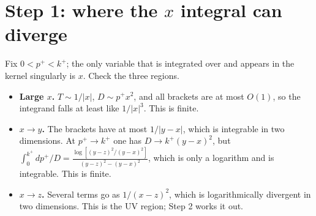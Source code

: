 \documentclass[10pt]{article}
\numberwithin{equation}{section}
\begin{document}
\section{Step 1: where the $x$ integral can diverge}
Fix $0<p^{+}<k^{+}$; the only variable that is integrated over and appears in the kernel singularly is $x$. Check the three regions.
\begin{itemize}
\item \textbf{Large $x$.} $T\sim1/|x|$, $D\sim p^{+}x^{2}$, and all brackets are at most $O(1)$, so the integrand falls at least like $1/|x|^{3}$. This is finite.
\item \textbf{$x\to y$.} The brackets have at most $1/|y-x|$, which is integrable in two dimensions. At $p^{+}\to k^{+}$ one has $D\to k^{+}(y-x)^{2}$, but $\int_{0}^{k^{+}}dp^{+}/D=\frac{\log[(y-z)^{2}/(y-x)^{2}]}{(y-z)^{2}-(y-x)^{2}}$, which is only a logarithm and is integrable. This is finite.
\item \textbf{$x\to z$.} Several terms go as $1/(x-z)^{2}$, which is logarithmically divergent in two dimensions. This is the UV region; Step 2 works it out.
\end{itemize}
\end{document}

